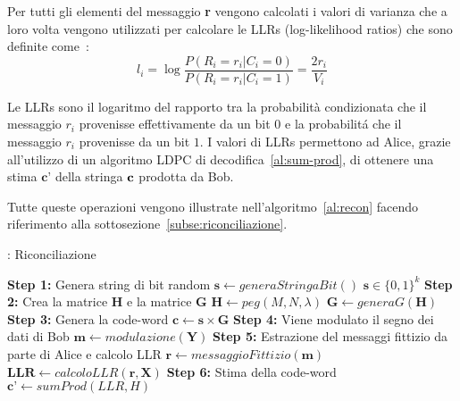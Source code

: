 Per tutti gli elementi del messaggio \textbf{r} vengono calcolati i valori di varianza che a loro volta vengono utilizzati per calcolare le LLRs (log-likelihood ratios) che sono definite come~\cite{gumucs2021novel}:
\begin{equation}
l_i = \log \frac{P(R_i = r_i| C_i = 0)}{P(R_i = r_i| C_i = 1)} = \frac{2r_i}{V_i}
\end{equation}

Le LLRs sono il logaritmo del rapporto tra la probabilit\`a condizionata che il messaggio $r_i$ provenisse effettivamente da un bit $0$ e la probabilit\'a che il messaggio $r_i$ provenisse da un bit $1$. I valori di LLRs permettono ad Alice, grazie all'utilizzo di un algoritmo LDPC di decodifica~\ref{al:sum-prod}, di ottenere una stima $\textbf{c'}$ della stringa $\textbf c$ prodotta da Bob.



Tutte queste operazioni vengono illustrate nell'algoritmo~\ref{al:recon} facendo riferimento alla sottosezione~\ref{subse:riconciliazione}.

\begin{algorithm}[t]
\caption{: Riconciliazione}\label{al:recon}
\begin{algorithmic}[1]
\State \textbf{Step 1:} Genera string di bit random
	\State $\textbf{s} \leftarrow generaStringaBit()$	\Comment $\textbf{s} \in \{0,1\}^k$
\State \textbf{Step 2:} Crea la matrice $\textbf{H}$ e la matrice $\textbf{G}$
	\State $\textbf{H} \leftarrow peg(M,N, \lambda )$	 
	\State {}							
	\State $ \textbf{G} \leftarrow generaG(\textbf{H})$
\State \textbf{Step 3:} Genera la code-word
	\State $\textbf{c} \leftarrow \textbf{s} \times \textbf{G}$
\State \textbf{Step 4:} Viene modulato il segno dei dati di Bob
	\State $\textbf{m} \leftarrow modulazione(\textbf{Y})$
\State \textbf{Step 5:} Estrazione del messaggi fittizio da parte di Alice e calcolo LLR
	\State $\textbf{r} \leftarrow messaggioFittizio(\textbf{m})$
	\State $\textbf{LLR} \leftarrow calcoloLLR(\textbf{r}, \textbf{X})$
\State \textbf{Step 6:} Stima della code-word
	\State $\textbf{c'} \leftarrow sumProd(LLR, H)$
\end{algorithmic}
\end{algorithm}

